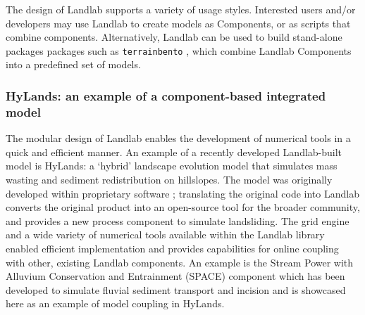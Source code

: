 \documentclass[12pt]{amsart}
\begin{document}
The design of Landlab supports a variety of usage styles. Interested users and/or developers may use Landlab to create models as Components, or as scripts that combine components. Alternatively, Landlab can be used to build stand-alone packages packages such as \texttt{terrainbento} \citep{barnhart2019terrainbento}, which combine Landlab Components into a predefined set of models.




\subsubsection{HyLands: an example of a component-based integrated model}
  
The modular design of Landlab enables the development of numerical tools in a quick and efficient manner. An example of a recently developed Landlab-built model is HyLands: a `hybrid' landscape evolution model that simulates mass wasting and sediment redistribution on hillslopes. The model was originally developed within proprietary software \citep{campforts2020hylands}; translating the original code into Landlab converts the original product into an open-source tool for the broader community, and provides a new process component to simulate landsliding. The grid engine and a wide variety of numerical tools available within the Landlab library enabled efficient implementation and provides capabilities for online coupling with other, existing Landlab components. An example is the Stream Power with Alluvium Conservation and Entrainment (SPACE) component which has been developed to simulate fluvial sediment transport and incision \citep{shobe2017space} and is showcased here as an example of model coupling in HyLands. 
\end{document}
